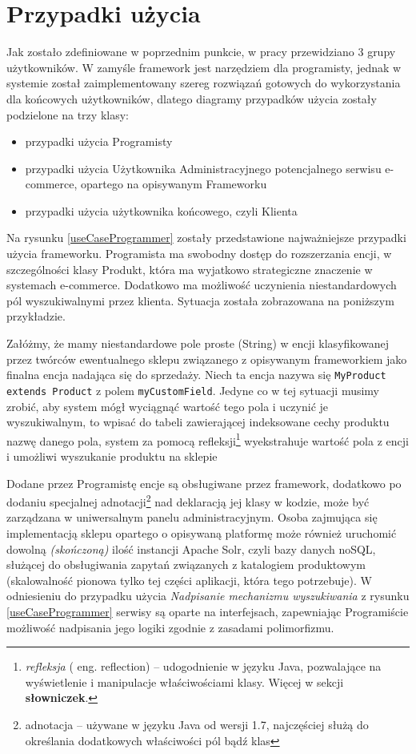 \section{Przypadki użycia}
Jak zostało zdefiniowane w poprzednim punkcie, w pracy przewidziano 3 grupy użytkowników. W zamyśle framework jest narzędziem dla programisty, jednak w systemie został zaimplementowany szereg rozwiązań gotowych do wykorzystania dla końcowych użytkowników, dlatego diagramy przypadków użycia zostały podzielone na trzy klasy: 
\begin{itemize}
	\item przypadki użycia Programisty 
	\item przypadki użycia Użytkownika Administracyjnego potencjalnego serwisu e-commerce, opartego na opisywanym Frameworku
	\item przypadki użycia użytkownika końcowego, czyli Klienta
\end{itemize}
Na rysunku \ref{useCaseProgrammer} zostały przedstawione najważniejsze przypadki użycia frameworku. Programista ma swobodny dostęp do rozszerzania encji, w szczególności klasy Produkt, która ma wyjatkowo strategiczne znaczenie w systemach e-commerce. Dodatkowo ma możliwość uczynienia niestandardowych pól wyszukiwalnymi przez klienta. Sytuacja została zobrazowana na poniższym przykładzie.
\begin{example}
	Załóżmy, że mamy niestandardowe pole proste (String) w encji klasyfikowanej przez twórców ewentualnego sklepu związanego z opisywanym frameworkiem jako finalna encja nadająca się do sprzedaży. Niech ta encja nazywa się \texttt{MyProduct extends Product} z polem \texttt{myCustomField}. Jedyne co w tej sytuacji musimy zrobić, aby system mógł wyciągnąć wartość tego pola i uczynić je wyszukiwalnym, to wpisać do tabeli zawierającej indeksowane cechy produktu nazwę danego pola, system za pomocą refleksji\footnote{\textit{refleksja} ( eng. reflection) -- udogodnienie w języku Java, pozwalające na wyświetlenie i manipulacje właściwościami klasy. Więcej w sekcji \textbf{słowniczek}.} wyekstrahuje wartość pola z encji i umożliwi wyszukanie produktu na sklepie
\end{example}

Dodane przez Programistę encje są obsługiwane przez framework, dodatkowo po dodaniu specjalnej adnotacji\footnote{adnotacja -- używane w języku Java od wersji 1.7, najczęściej służą do określania dodatkowych właściwości pól bądź klas} nad deklaracją jej klasy w kodzie, może być zarządzana w uniwersalnym panelu administracyjnym. Osoba zajmująca się implementacją sklepu opartego o opisywaną platformę może również uruchomić dowolną \textit{(skończoną)} ilość instancji Apache Solr, czyli bazy danych noSQL, służącej do obsługiwania zapytań związanych z katalogiem produktowym (skalowalność pionowa tylko tej części aplikacji, która tego potrzebuje). W odniesieniu do przypadku użycia \textit{Nadpisanie mechanizmu wyszukiwania} z rysunku \ref{useCaseProgrammer} serwisy są oparte na interfejsach, zapewniając Programiście możliwość nadpisania jego logiki zgodnie z zasadami polimorfizmu. 

